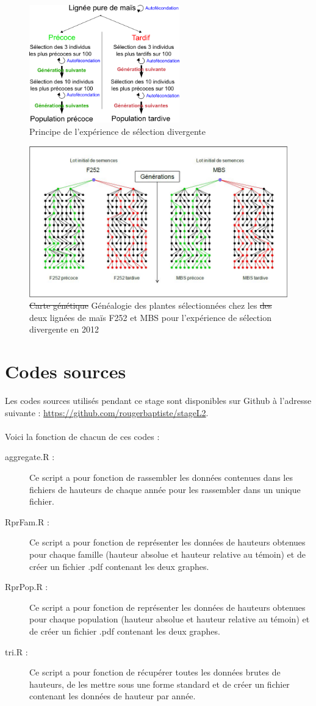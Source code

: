 \documentclass[12pt,a4paper]{report}
\newcommand{\com}[1]{{\noindent  \color{red}#1}}
\begin{document}
			\begin{figure}
				\centering
				\includegraphics[width=6.5cm]{selec_div.png}
				\caption{Principe de l'expérience de sélection divergente}
				\label{selec.div}
			\end{figure}
			\begin{figure}
				\centering
				\includegraphics[width = 6.5 cm]{carte_gen.jpg}
				\caption{\sout{Carte génétique} \com{Généalogie des plantes sélectionnées chez les} \sout{des} deux lignées de maïs F252 et MBS pour l'expérience de sélection divergente en 2012}
				\label{carte_gen}
			\end{figure}
			
	
	
	
	\appendix
	
	\chapter{Codes sources}
	Les codes sources utilisés pendant ce stage sont disponibles sur Github à l'adresse suivante : \url{https://github.com/rougerbaptiste/stageL2}.\\~\\
	Voici la fonction de chacun de ces codes :
	\begin{description}
		\item [aggregate.R :] Ce script a pour fonction de rassembler les données contenues dans les fichiers de hauteurs de chaque année pour les rassembler dans un unique fichier.
		\item [RprFam.R :] Ce script a pour fonction de représenter les données de hauteurs obtenues pour chaque famille (hauteur absolue et hauteur relative au témoin) et de créer un fichier .pdf contenant les deux graphes.
		\item [RprPop.R :] Ce script a pour fonction de représenter les données de hauteurs obtenues pour chaque population (hauteur absolue et hauteur relative au témoin) et de créer un fichier .pdf contenant les deux graphes.
		\item [tri.R :] Ce script a pour fonction de récupérer toutes les données brutes de hauteurs, de les mettre sous une forme standard et de créer un fichier contenant les données de hauteur par année.
		
	\end{description}
\end{document}
